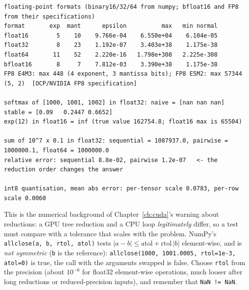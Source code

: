 \documentclass[10pt,a4paper,openany,oneside]{report}
\begin{document}
\begin{lstlisting}[style=out,basicstyle=\ttfamily\fontsize{7.2}{8.6}\selectfont,title={Captured output}]
floating-point formats (binary16/32/64 from numpy; bfloat16 and FP8 from their specifications)
format       exp  mant      epsilon          max   min normal
float16        5    10    9.766e-04    6.550e+04    6.104e-05
float32        8    23    1.192e-07    3.403e+38    1.175e-38
float64       11    52    2.220e-16   1.798e+308   2.225e-308
bfloat16       8     7    7.812e-03    3.390e+38    1.175e-38
FP8 E4M3: max 448 (4 exponent, 3 mantissa bits); FP8 E5M2: max 57344 (5, 2)  [OCP/NVIDIA FP8 specification]

softmax of [1000, 1001, 1002] in float32: naive = [nan nan nan]  stable = [0.09   0.2447 0.6652]
exp(12) in float16 = inf (true value 162754.8; float16 max is 65504)

sum of 10^7 x 0.1 in float32: sequential = 1087937.0, pairwise = 1000000.1, float64 = 1000000.0
relative error: sequential 8.8e-02, pairwise 1.2e-07   <- the reduction order changes the answer

int8 quantisation, mean abs error: per-tensor scale 0.0783, per-row scale 0.0060
\end{lstlisting}
This is the numerical background of Chapter~\ref{ch:cuda}'s warning about reductions: a GPU tree reduction and a CPU loop \emph{legitimately} differ, so a test must compare with a tolerance that scales with the problem. NumPy's \texttt{allclose(a, b, rtol, atol)} tests $|a-b|\le \text{atol}+\text{rtol}\,|b|$ element-wise, and is \emph{not symmetric} (\texttt{b} is the reference): \texttt{allclose(1000, 1001.0005, rtol=1e-3, atol=0)} is true, the call with the arguments swapped is false. Choose \texttt{rtol} from the precision (about $10^{-6}$ for float32 element-wise operations, much looser after long reductions or reduced-precision inputs), and remember that \texttt{NaN != NaN}.
\end{document}
